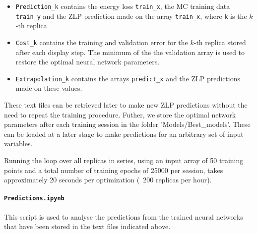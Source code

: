 \begin{itemize}

\item {\tt Prediction\_k} contains the energy loss {\tt train\_x}, the MC training data {\tt train\_y}
and the ZLP prediction made on the array {\tt train\_x}, where {\tt k} is the $k$-th replica. 
\item {\tt Cost\_k} contains the training and validation error for the
  $k$-th replica
stored after each display step. 
The minimum of the the validation array is used to restore the optimal
neural network parameters.
\item {\tt Extrapolation\_k} contains the arrays {\tt predict\_x} and the ZLP predictions made on these values. 
\end{itemize}
These text files can be retrieved later to make new ZLP predictions
without the need to repeat the training procedure.
%
Futher, we store the optimal network parameters after each training session in the folder
'Models/Best\_models'. 
%
These can be loaded at a later stage
to make predictions for an arbitrary set of input variables. 

Running the loop over all replicas in series, using an input array of \~50 training points 
and a total number of training epochs of 25000 per session,
takes approximately 20 seconds per optimization (~200 replicas per hour).





\noindent
\paragraph{\tt Predictions.ipynb}
This script is used to analyse the predictions from the trained
neural networks that have been stored in the text files indicated above.

